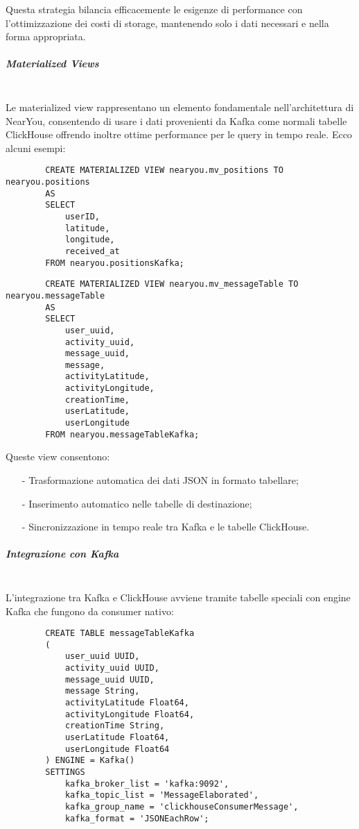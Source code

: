 \documentclass[10pt]{article}
\newcommand{\mysubparagraph}[1]{\subparagraph{#1}\mbox{}\\}
\begin{document}
        Questa strategia bilancia efficacemente le esigenze di performance con l'ottimizzazione dei costi di storage, mantenendo solo i dati necessari e nella forma appropriata.
        
        \mysubparagraph{Materialized Views}
        Le materialized view rappresentano un elemento fondamentale nell'architettura di NearYou, consentendo di usare i dati provenienti da Kafka come normali tabelle ClickHouse offrendo inoltre ottime performance per le query in tempo reale. Ecco alcuni esempi:
        
        \begin{lstlisting}
        CREATE MATERIALIZED VIEW nearyou.mv_positions TO nearyou.positions
        AS
        SELECT
            userID,
            latitude,
            longitude,
            received_at
        FROM nearyou.positionsKafka;
        \end{lstlisting}
        
        \begin{lstlisting}
        CREATE MATERIALIZED VIEW nearyou.mv_messageTable TO nearyou.messageTable
        AS
        SELECT
            user_uuid,
            activity_uuid,
            message_uuid,
            message,
            activityLatitude,
            activityLongitude,
            creationTime,
            userLatitude,
            userLongitude
        FROM nearyou.messageTableKafka;
        \end{lstlisting}
        
        Queste view consentono:
        \begin{itemize}
            \item[-] Trasformazione automatica dei dati JSON in formato tabellare;
            \item[-] Inserimento automatico nelle tabelle di destinazione;
            \item[-] Sincronizzazione in tempo reale tra Kafka e le tabelle ClickHouse.
        \end{itemize}
        
        \mysubparagraph{Integrazione con Kafka}
        L'integrazione tra Kafka e ClickHouse avviene tramite tabelle speciali con engine Kafka che fungono da consumer nativo:
        
        \begin{lstlisting}
        CREATE TABLE messageTableKafka
        (
            user_uuid UUID,
            activity_uuid UUID,
            message_uuid UUID,
            message String,
            activityLatitude Float64,
            activityLongitude Float64,
            creationTime String,
            userLatitude Float64,
            userLongitude Float64
        ) ENGINE = Kafka()
        SETTINGS 
            kafka_broker_list = 'kafka:9092',
            kafka_topic_list = 'MessageElaborated',
            kafka_group_name = 'clickhouseConsumerMessage',
            kafka_format = 'JSONEachRow';
        \end{lstlisting}
        
\end{document}
